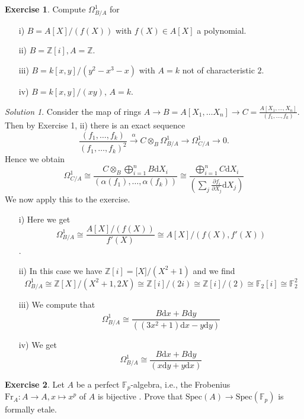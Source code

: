 \documentclass[11pt]{article}
\theoremstyle{definition}
\newtheorem{exercise}{Exercise}
\theoremstyle{remark}
\newtheorem*{solution}{Solution}
\begin{document}
\begin{exercise}
Compute $\Omega_{B/A}^1$ for
\begin{enumerate}
\item[i)] $B = A[X] / (f(X))$ with $f(X) \in A[X]$ a polynomial.
\item[ii)]$B = \mathbb{Z}[i], A=\mathbb{Z}$.
\item[iii)] $B = k[x,y]/(y^2-x^3-x)$ with $A=k$ not of characteristic $2$.
\item[iv)] $B=k[x,y]/(xy)$, $A=k$.
\end{enumerate}
\end{exercise}
\begin{solution}
Consider the map of rings $ A \rightarrow B = A[X_1,\dots X_n] \rightarrow C = \frac{A[X_1,\dots , X_n]}{(f_1,\dots , f_k)}$.
Then by Exercise 1, ii) there is an exact sequence
$$\frac{(f_1, \dots , f_k)}{(f_1, \dots , f_k)^2} \xrightarrow[]{\alpha} C\otimes_B \Omega_{B/A}^1 \rightarrow \Omega_{C/A}^1 \rightarrow 0.$$
Hence we obtain 
$$
\Omega_{C/A}^1 \cong \frac{C\otimes_B \bigoplus_{i=1}^n B\text{d}X_i}{(\alpha(f_1), \dots ,\alpha(f_k))} \cong \frac{ \bigoplus_{i=1}^n C\text{d}X_i}{(\sum_j \frac{\partial f_i}{\partial X_j}\text{d}X_j)}
$$
We now apply this to the exercise.
\begin{enumerate}
\item[i)] Here we get $$\Omega_{B/A}^1 \cong \frac{A[X]/(f(X))}{f'(X)} \cong A[X]/(f(X), f'(X))$$.
\item[ii)] In this case we have $\mathbb{Z}[i] = \mathbb[X] / (X^2+1)$ and we find 
$$\Omega_{B/A}^1 \cong \mathbb{Z}[X]/(X^2+1,2X) \cong \mathbb{Z}[i]/(2i) \cong \mathbb{Z}[i]/(2) \cong \mathbb{F}_2[i] \cong \mathbb{F}_2^2$$
\item[iii)] We compute that $$\Omega_{B/A}^1 \cong \frac{B\text{d}x+ B\text{d}y}{((3x^2+1)\text{d}x - y\text{d}y)} $$
\item[iv)] We get
$$\Omega_{B/A}^1 \cong \frac{B\text{d}x+ B\text{d}y}{(x\text{d}y+y\text{d}x)} $$
\end{enumerate}
\end{solution}
\begin{exercise}
Let $A$ be a perfect $\mathbb{F}_p$-algebra, i.e., the Frobenius $\text{Fr}_A : A\rightarrow A, x \mapsto x^p$ of $A$ is bijective . Prove that $\text{Spec}(A) \rightarrow \text{Spec}(\mathbb{F}_p)$ is formally etale.
\end{exercise}
\end{document}
